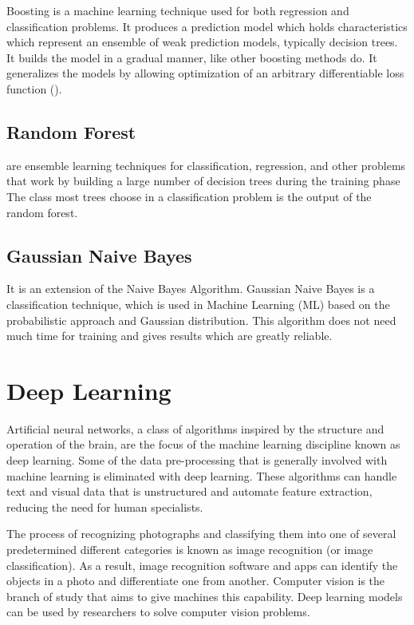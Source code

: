 
Boosting is a machine learning technique used for both regression and classification problems. It produces a prediction model which holds characteristics which represent an ensemble of weak prediction models, typically decision trees. It builds the model in a gradual manner, like other boosting methods do. It generalizes the models by allowing optimization of an arbitrary differentiable loss function (\cite{ar27}).

\subsection{Random Forest}
are ensemble learning techniques for classification, regression, and other problems that work by building a large number of decision trees during the training phase The class most trees choose in a classification problem is the output of the random forest.

\subsection{Gaussian Naive Bayes}
It is an extension of the Naive Bayes Algorithm. Gaussian Naive Bayes is a classification technique, which is used in Machine Learning (ML) based on the probabilistic approach and Gaussian distribution. This algorithm does not need much time for training and gives results which are greatly reliable. 

\section{Deep Learning}
Artificial neural networks, a class of algorithms inspired by the structure and operation of the brain, are the focus of the machine learning discipline known as deep learning. Some of the data pre-processing that is generally involved with machine learning is eliminated with deep learning. These algorithms can handle text and visual data that is unstructured and automate feature extraction, reducing the need for human specialists. 

The process of recognizing photographs and classifying them into one of several predetermined different categories is known as image recognition (or image classification). As a result, image recognition software and apps can identify the objects in a photo and differentiate one from another. Computer vision is the branch of study that aims to give machines this capability. Deep learning models can be used by researchers to solve computer vision problems.

